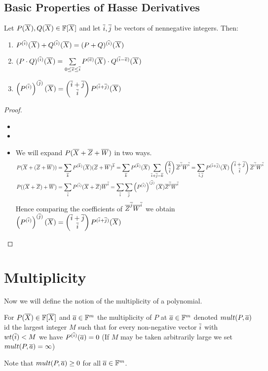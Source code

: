 \subsection{Basic Properties of Hasse Derivatives}
\begin{proposition}\label{hasseprop}
	Let $P(\ovX), Q(\ovX)\in \bbF[\ovX]$ and let $\ovi, \ovj$ be vectors of nennegative integers. Then:\begin{enumerate}
		\item $P^{(\ovi)}(\ovX)+Q^{(\ovi)}(\ovX)=(P+Q)^{(\ovi)}(\ovX)$
		\item $(P\cdot Q)^{(\ovi)}(\ovX)=\sum\limits_{0\leq \ove\leq \ovi}P^{(\ove)}(\ovX)\cdot Q^{(\ovi-\ove)}(\ovX)$
		\item $\lt(P^{(\ovi)}\rt)^{(\ovj)}(\ovX)=\comb{\ovi+\ovj}{\ovi} P^{(\ovi+\ovj)}(\ovX)$
	\end{enumerate}
\end{proposition}
\begin{proof}
	\begin{itemize}
		\item 
		\item 
		\item We will expand $P(\ovX+\ovZ+\ovW)$ in two ways. \begin{align*}
			P(\ovX+(\ovZ+\ovW)) &= \sum_{\ovk} P^{(\ovk)}(\ovX)(\ovZ+\ovW)^{\ovk}  = \sum_{\ovk}P^{(\ovk)}(\ovX)\sum_{\ovi+\ovj=\ovk}\comb{\ovk}{\ovi}\ovZ^{\ovj}\ovW^{\ovi} = \sum_{\ovi,\ovj}P^{(\ovi+\ovj)}(\ovX)\comb{\ovi+\ovj}{\ovi}\ovZ^{\ovj}\ovW^{\ovi}\\
			P((\ovX+\ovZ)+\ovW) &=\sum_{\ovi}P^{(\ovi)}(\ovX+\ovZ)\ovW^{\ovi}=\sum_{\ovi}\sum_{\ovj}\lt(P^{(\ovi)}\rt)^{(\ovj)}(\ovX)\ovZ^{\ovj}\ovW^{\ovi}
		\end{align*}
		Hence  comparing the coefficients of $\ovZ^{\ovj}\ovW^{\ovi}$ we obtain $\lt(P^{(\ovi)}\rt)^{(\ovj)}(\ovX)=\comb{\ovi+\ovj}{\ovi}P^{(\ovi+\ovj)}(\ovX)$
	\end{itemize}
\end{proof}
\section{Multiplicity}
Now we will define the notion of the multiplicity of a polynomial.
\begin{definition}[Multiplicity]
	For $P(\ovX)\in \bbF[\ovX]$ and $\ova\in \bbF^m$ the multiplicity of $P$ at $\ova\in \bbF^m$ denoted $mult(P,\ova)$ id the largest integer $M$ such that for every non-negative vector $\ovi$ with $wt(\ovi)<M$ we have $P^{(\ovi)}(\ova)=0$ (If $M$ may be taken arbitrarily large we set $mult(P,\ova)=\infty$)
\end{definition}
Note that $mult(P,\ova)\geq 0$ for all $\ova\in \bbF^m$.
